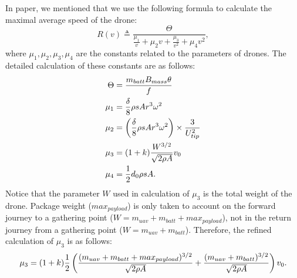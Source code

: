 \documentclass[preprint,review,11pt,authoryear]{elsarticle}
\begin{document}
In paper, we mentioned that we use the following formula to calculate the maximal average speed of the drone:
\begin{equation}
    R(v) \triangleq \frac{\Theta}{\frac{\mu_1}{v} + \mu_2 v + \frac{\mu_3}{v^2} + \mu_4 v^2}, \label{eq:range_speed_formula}
\end{equation}
where $\mu_1, \mu_2, \mu_3, \mu_4$ are the constants related to the parameters of drones. The detailed calculation of these constants are as follows:
\begin{align}
    \Theta & = \frac{m_{batt}B_{mass}\theta}{f} \\
    \mu_1 & = \frac{\delta}{8} \rho s A r^3 \omega^2 \\
    \mu_2 & = \left(\frac{\delta}{8} \rho s A r^3 \omega^2\right) \times \frac{3}{U^2_{tip}} \\
    \mu_3 & = (1+k) \frac{W^{3\slash2}}{\sqrt{2\rho A}} v_0 \\
    \mu_4 & = \frac12 d_0 \rho s A.
\end{align}
Notice that the parameter $W$ used in calculation of $\mu_3$ is the total weight of the drone. Package weight ($max_{payload}$) is only taken to account on the forward journey to a gathering point ($W = m_{uav} + m_{batt} + max_{payload}$), not in the return journey from a gathering point ($W = m_{uav} + m_{batt}$). Therefore, the refined calculation of $\mu_3$ is as follows:
\begin{equation}
    \mu_3 = (1+k)  \frac12 \left( \frac{(m_{uav} + m_{batt} + max_{payload})^{3\slash2}}{\sqrt{2\rho A}} + \frac{(m_{uav} + m_{batt})^{3\slash2}}{\sqrt{2\rho A}} \right) v_0.
\end{equation}
\end{document}
